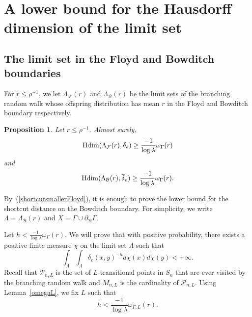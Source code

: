 \documentclass{amsart}
\newtheorem{prop}[thm]{Proposition}
\theoremstyle{definition}
\theoremstyle{remark}
\newcommand{\Hdim}{{\rm Hdim}}
\begin{document}








\section{A lower bound for the Hausdorff dimension of the limit set}\label{SectionlowerboundHausdorff}
\subsection{The limit set in the Floyd and Bowditch boundaries}
For $r\leq \rho^{-1}$, we let $\Lambda_\mathcal{F}(r)$ and $\Lambda_\mathcal{B}(r)$ be the limit sets of the branching random walk whose offspring distribution has mean $r$ in the Floyd and Bowditch boundary respectively.
\begin{prop}\label{lowerboundHdim}
Let $r\leq \rho^{-1}$.
Almost surely,
$$\Hdim(\Lambda_\mathcal{F}(r),\delta_e)\geq \frac{-1}{\log \lambda}\omega_{\Gamma}(r)$$
and
$$\Hdim(\Lambda_\mathcal{B}(r),\overline{\delta}_e)\geq \frac{-1}{\log \lambda}\omega_{\Gamma}(r).$$
\end{prop}

By~(\ref{shortcutsmallerFloyd}), it is enough to prove the lower bound for the shortcut distance on the Bowditch boundary.
For simplicity, we write $\Lambda=\Lambda_\mathcal{B}(r)$ and $X=\Gamma\cup \partial_{\mathcal{B}}\Gamma$.

Let $h<\frac{-1}{\log \lambda}\omega_\Gamma(r)$.
We will prove that with positive probability, there exists a positive finite measure $\chi$ on the limit set $\Lambda$ such that
$$\int_{\Lambda}\int_{\Lambda}\overline{\delta}_e(x,y)^{-h}d\chi(x)d\chi(y)<+\infty.$$
Recall that $\mathcal{P}_{n,L}$ is the set of $L$-transitional points in $S_n$ that are ever visited by the branching random walk and $M_{n,L}$ is the cardinality of $\mathcal{P}_{n,L}$.
Using Lemma~\ref{omegaL}, we fix $L$ such that
\begin{equation}\label{choiceofL}
h<\frac{-1}{\log \lambda}\omega_{\Gamma,L}(r).
\end{equation}
\end{document}
